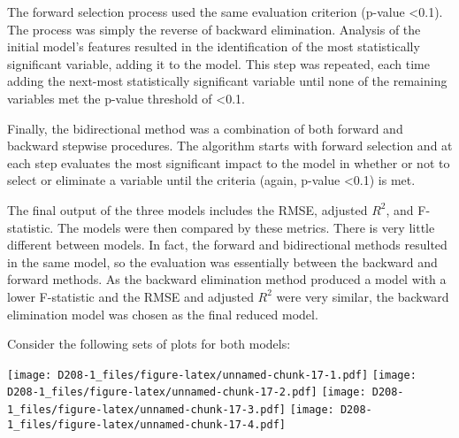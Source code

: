 \documentclass[
]{article}
\newenvironment{Shaded}{\begin{snugshade}}{\end{snugshade}}
\newcommand{\CommentTok}[1]{\textcolor[rgb]{0.56,0.35,0.01}{\textit{#1}}}
\newcommand{\FunctionTok}[1]{\textcolor[rgb]{0.00,0.00,0.00}{#1}}
\newcommand{\NormalTok}[1]{#1}
\newcommand{\SpecialCharTok}[1]{\textcolor[rgb]{0.00,0.00,0.00}{#1}}
\begin{document}
The forward selection process used the same evaluation criterion
(p-value \textless0.1). The process was simply the reverse of backward
elimination. Analysis of the initial model's features resulted in the
identification of the most statistically significant variable, adding it
to the model. This step was repeated, each time adding the next-most
statistically significant variable until none of the remaining variables
met the p-value threshold of \textless0.1.

Finally, the bidirectional method was a combination of both forward and
backward stepwise procedures. The algorithm starts with forward
selection and at each step evaluates the most significant impact to the
model in whether or not to select or eliminate a variable until the
criteria (again, p-value \textless0.1) is met.

The final output of the three models includes the RMSE, adjusted
\(R^2\), and F-statistic. The models were then compared by these
metrics. There is very little different between models. In fact, the
forward and bidirectional methods resulted in the same model, so the
evaluation was essentially between the backward and forward methods. As
the backward elimination method produced a model with a lower
F-statistic and the RMSE and adjusted \(R^2\) were very similar, the
backward elimination model was chosen as the final reduced model.

Consider the following sets of plots for both models:

\begin{Shaded}
\end{Shaded}

\texttt{[image: D208-1\_files/figure-latex/unnamed-chunk-17-1.pdf]}
\texttt{[image: D208-1\_files/figure-latex/unnamed-chunk-17-2.pdf]}
\texttt{[image: D208-1\_files/figure-latex/unnamed-chunk-17-3.pdf]}
\texttt{[image: D208-1\_files/figure-latex/unnamed-chunk-17-4.pdf]}

\begin{Shaded}
\end{Shaded}
\end{document}
